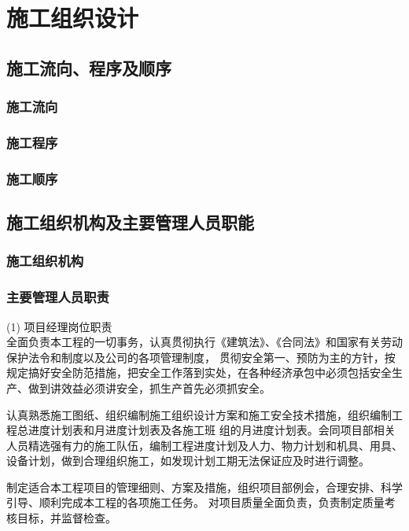 \section{施工组织设计}

\subsection{施工流向、程序及顺序}
\subsubsection{施工流向}
\subsubsection{施工程序}
\subsubsection{施工顺序}

\subsection{施工组织机构及主要管理人员职能}
\subsubsection{施工组织机构}
\subsubsection{主要管理人员职责}

(1) 项目经理岗位职责\\

 全面负责本工程的一切事务，认真贯彻执行《建筑法》、《合同法》和国家有关劳动保护法令和制度以及公司的各项管理制度，
贯彻安全第一、预防为主的方针，按规定搞好安全防范措施，把安全工作落到实处，在各种经济承包中必须包括安全生产、做到讲效益必须讲安全，抓生产首先必须抓安全。

 认真熟悉施工图纸、组织编制施工组织设计方案和施工安全技术措施，组织编制工程总进度计划表和月进度计划表及各施工班
组的月进度计划表。会同项目部相关人员精选强有力的施工队伍，编制工程进度计划及人力、物力计划和机具、用具、设备计划，做到合理组织施工，如发现计划工期无法保证应及时进行调整。

 制定适合本工程项目的管理细则、方案及措施，组织项目部例会，合理安排、科学引导、顺利完成本工程的各项施工任务。
对项目质量全面负责，负责制定质量考核目标，并监督检查。

